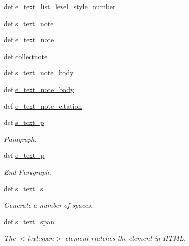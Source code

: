 \begin{DoxyCompactItemize}
\item 
def \hyperlink{classodf_1_1odf2xhtml_1_1ODF2XHTML_ab92bb61c9d74eced51c5169942866c66}{e\+\_\+text\+\_\+list\+\_\+level\+\_\+style\+\_\+number}
\item 
def \hyperlink{classodf_1_1odf2xhtml_1_1ODF2XHTML_a476bdcd2f9760b8446cc0291c96bebc3}{s\+\_\+text\+\_\+note}
\item 
def \hyperlink{classodf_1_1odf2xhtml_1_1ODF2XHTML_a0f1d6dc0b0e9cd9b30a20e2c6e8f3e52}{e\+\_\+text\+\_\+note}
\item 
def \hyperlink{classodf_1_1odf2xhtml_1_1ODF2XHTML_ac25991fe248e114031e00ec0118b1fe2}{collectnote}
\item 
def \hyperlink{classodf_1_1odf2xhtml_1_1ODF2XHTML_a6ee7c9873700d9e33ac0a37f087d2ac2}{s\+\_\+text\+\_\+note\+\_\+body}
\item 
def \hyperlink{classodf_1_1odf2xhtml_1_1ODF2XHTML_a01c9fc7b546a51d34138689bc08ad423}{e\+\_\+text\+\_\+note\+\_\+body}
\item 
def \hyperlink{classodf_1_1odf2xhtml_1_1ODF2XHTML_ae9568b8626799b560059d7960e7df42b}{e\+\_\+text\+\_\+note\+\_\+citation}
\item 
def \hyperlink{classodf_1_1odf2xhtml_1_1ODF2XHTML_ac17dd4b6c57cb1157445d4fcc3aee9e1}{s\+\_\+text\+\_\+p}
\begin{DoxyCompactList}\small\item\em Paragraph. \end{DoxyCompactList}\item 
def \hyperlink{classodf_1_1odf2xhtml_1_1ODF2XHTML_a8c328424b530f1468b8d57afea41a8dc}{e\+\_\+text\+\_\+p}
\begin{DoxyCompactList}\small\item\em End Paragraph. \end{DoxyCompactList}\item 
def \hyperlink{classodf_1_1odf2xhtml_1_1ODF2XHTML_aac439ed467736770cb5d39587b02c370}{s\+\_\+text\+\_\+s}
\begin{DoxyCompactList}\small\item\em Generate a number of spaces. \end{DoxyCompactList}\item 
def \hyperlink{classodf_1_1odf2xhtml_1_1ODF2XHTML_a3e284651f634c7b7dcae4b1e50ef7c40}{s\+\_\+text\+\_\+span}
\begin{DoxyCompactList}\small\item\em The $<$text\+:span$>$ element matches the  element in H\+T\+M\+L. \end{DoxyCompactList}\item 

\end{DoxyCompactItemize}
